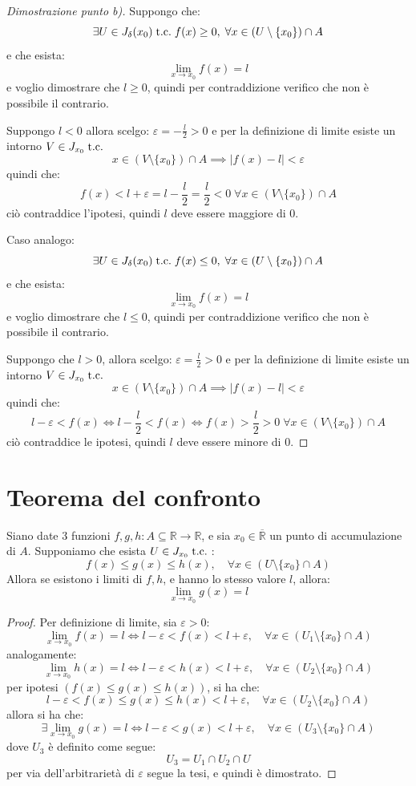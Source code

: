 \documentclass[a4paper,12pt,openright]{book}
\begin{document}
	\begin{proof}[Dimostrazione punto b)]
		Suppongo che:
		\[\exists U \in J_\delta(x_0) \;\text{t.c.}\; f(x) \geq 0, \; \forall x \in (U \setminus \{x_0\}) \cap A\] 
		e che esista:
		\[\lim_{x \rightarrow x_0} f(x) = l\]
		e voglio dimostrare che $l \geq 0$, quindi per contraddizione verifico che non è possibile il contrario.
		
		Suppongo $l < 0$ allora scelgo: $\varepsilon = -\frac{l}{2} > 0$ e per la definizione di limite esiste un intorno $V \in J_{x_0} \;\text{t.c.}\;$
		\[x \in (V \setminus \{x_0\}) \cap A \implies |f(x) - l| < \varepsilon\]
		quindi che:
		\[f(x) < l + \varepsilon = l - \frac{l}{2} = \frac{l}{2} < 0\; \forall x \in (V \setminus \{x_0\}) \cap A\]
		ciò contraddice l'ipotesi, quindi $l$ deve essere maggiore di 0.
		
		Caso analogo:
		\[\exists U \in J_\delta(x_0) \;\text{t.c.}\; f(x) \leq 0, \; \forall x \in (U \setminus \{x_0\}) \cap A\] 
		e che esista:
		\[\lim_{x \rightarrow x_0} f(x) = l\]
		e voglio dimostrare che $l \leq 0$, quindi per contraddizione verifico che non è possibile il contrario.
		
		Suppongo che $l > 0$, allora scelgo: $\varepsilon = \frac{l}{2} > 0$ e per la definizione di limite esiste un intorno $V \in J_{x_0} \;\text{t.c.}\;$
		\[x \in (V \setminus \{x_0\}) \cap A \implies |f(x) - l| < \varepsilon\]
		quindi che:
		\[l - \varepsilon < f(x) \iff l - \frac{l}{2} < f(x) \iff f(x) > \frac{l}{2} > 0\; \forall x \in (V \setminus \{x_0\}) \cap A\]
		ciò contraddice le ipotesi, quindi $l$ deve essere minore di 0.		
		
	\end{proof}
	
	\newpage
	
	\section{Teorema del confronto}
	Siano date 3 funzioni $f, g, h: A \subseteq \mathbb{R} \longrightarrow \mathbb{R}$, e sia $x_0 \in \overline{\mathbb{R}}$ un punto di accumulazione di $A$. Supponiamo che esista $U \in J_{x_0} \;\text{t.c.}\;$:
	\[f(x) \leq g(x) \leq h(x), \quad \forall x \in (U \setminus \{x_0\} \cap A)\]
	Allora se esistono i limiti di $f, h$, e hanno lo stesso valore $l$, allora:
	\[\lim_{x \rightarrow x_0} g(x) = l\]
	\begin{proof}
		Per definizione di limite, sia $\varepsilon > 0$:
		\[\lim_{x \rightarrow x_0} f(x) = l \iff l - \varepsilon < f(x) < l + \varepsilon, \quad \forall x \in (U_1 \setminus \{x_0\} \cap A)\]
		analogamente:
		 \[\lim_{x \rightarrow x_0} h(x) = l \iff l - \varepsilon < h(x) < l + \varepsilon, \quad \forall x \in (U_2 \setminus \{x_0\} \cap A)\]
		 per ipotesi $(f(x) \leq g(x) \leq h(x))$, si ha che:
		 \[l - \varepsilon < f(x) \leq g(x) \leq h(x) < l + \varepsilon, \quad \forall x \in (U_2 \setminus \{x_0\} \cap A)\]
		 allora si ha che:
		 \[\exists \lim_{x \rightarrow x_0} g(x) = l \iff l - \varepsilon < g(x) < l + \varepsilon, \quad \forall x \in (U_3 \setminus \{x_0\} \cap A)\]
		 dove $U_3$ è definito come segue:
		 \[U_3 = U_1 \cap U_2 \cap U\]
		 per via dell'arbitrarietà di $\varepsilon$ segue la tesi, e quindi è dimostrato.
	\end{proof}
	
\end{document}
